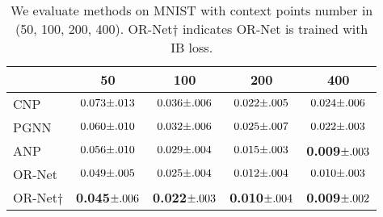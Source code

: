 \begin{table}
  \centering 
  \caption{We evaluate methods on MNIST with context points number in (50, 100, 200, 400). OR-Net$\dagger$ indicates OR-Net is trained with IB loss.}
  \setlength{\tabcolsep}{1.25mm}
  \begin{tabular}{lcccc}
    \toprule
         & 50    & 100  & 200  & 400  \\
    \midrule
    CNP~\cite{garnelo2018conditional}       & $0.073\small{\pm .013}$ & $0.036\small{\pm .006}$ & $0.022\small{\pm .005}$ & $0.024\small{\pm .006}$ \\
    PGNN~\cite{you2019position}     & $0.060\small{\pm .010}$ & $0.032\small{\pm .006}$ & $0.025\small{\pm .007}$ & $0.022\small{\pm .003}$ \\
    ANP~\cite{kim2019attentive}       & $0.056\small{\pm .010}$ & $0.029\small{\pm .004}$ & $0.015\small{\pm .003}$ & \textbf{0.009$\small{\pm .003}$} \\
    \midrule
    OR-Net       & $0.049\small{\pm .005}$ & $0.025\small{\pm .004}$ & $0.012\small{\pm .004}$ & $0.010\small{\pm .003}$ \\
    OR-Net$\dagger$       & \textbf{0.045$\small{\pm .006}$} & \textbf{0.022$\small{\pm .003}$} & \textbf{0.010$\small{\pm .004}$} & \textbf{0.009$\small{\pm .002}$} \\
    \bottomrule
  \end{tabular}
  \label{tab:1-mnist}
\end{table}